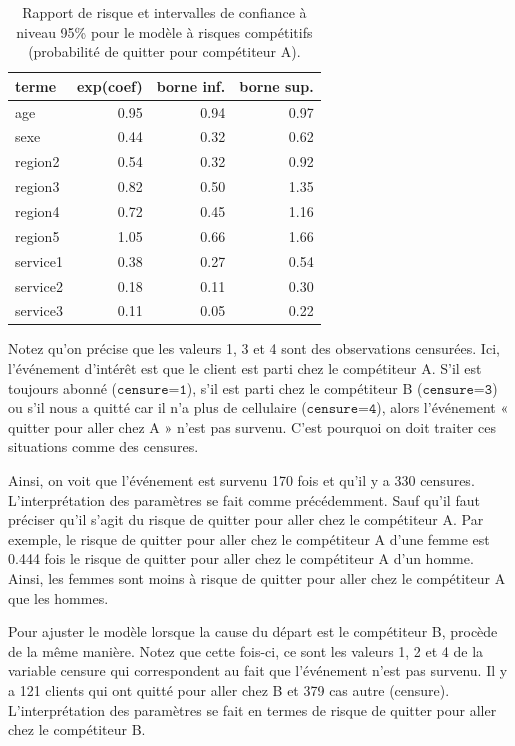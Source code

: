\documentclass[
  11pt,
  letterpaper,
]{book}
\theoremstyle{definition}
\theoremstyle{remark}
\begin{document}
\hypertarget{tbl-cox-risquecompetA}{}
\begin{table}
\caption{\label{tbl-cox-risquecompetA}Rapport de risque et intervalles de confiance à niveau 95\% pour le
modèle à risques compétitifs (probabilité de quitter pour compétiteur
A). }\tabularnewline

\centering
\begin{tabular}{lrrr}
\toprule
terme & exp(coef) & borne inf. & borne sup.\\
\midrule
age & 0.95 & 0.94 & 0.97\\
sexe & 0.44 & 0.32 & 0.62\\
region2 & 0.54 & 0.32 & 0.92\\
region3 & 0.82 & 0.50 & 1.35\\
region4 & 0.72 & 0.45 & 1.16\\
\addlinespace
region5 & 1.05 & 0.66 & 1.66\\
service1 & 0.38 & 0.27 & 0.54\\
service2 & 0.18 & 0.11 & 0.30\\
service3 & 0.11 & 0.05 & 0.22\\
\bottomrule
\end{tabular}
\end{table}

Notez qu'on précise que les valeurs 1, 3 et 4 sont des observations
censurées. Ici, l'événement d'intérêt est que le client est parti chez
le compétiteur A. S'il est toujours abonné (\(\texttt{censure=1}\)),
s'il est parti chez le compétiteur B (\(\texttt{censure=3}\)) ou s'il
nous a quitté car il n'a plus de cellulaire (\(\texttt{censure=4}\)),
alors l'événement « quitter pour aller chez A » n'est pas survenu. C'est
pourquoi on doit traiter ces situations comme des censures.

Ainsi, on voit que l'événement est survenu 170 fois et qu'il y a 330
censures. L'interprétation des paramètres se fait comme précédemment.
Sauf qu'il faut préciser qu'il s'agit du risque de quitter pour aller
chez le compétiteur A. Par exemple, le risque de quitter pour aller chez
le compétiteur A d'une femme est 0.444 fois le risque de quitter pour
aller chez le compétiteur A d'un homme. Ainsi, les femmes sont moins à
risque de quitter pour aller chez le compétiteur A que les hommes.

Pour ajuster le modèle lorsque la cause du départ est le compétiteur B,
procède de la même manière. Notez que cette fois-ci, ce sont les valeurs
1, 2 et 4 de la variable censure qui correspondent au fait que
l'événement n'est pas survenu. Il y a 121 clients qui ont quitté pour
aller chez B et 379 cas autre (censure). L'interprétation des paramètres
se fait en termes de risque de quitter pour aller chez le compétiteur B.
\end{document}
